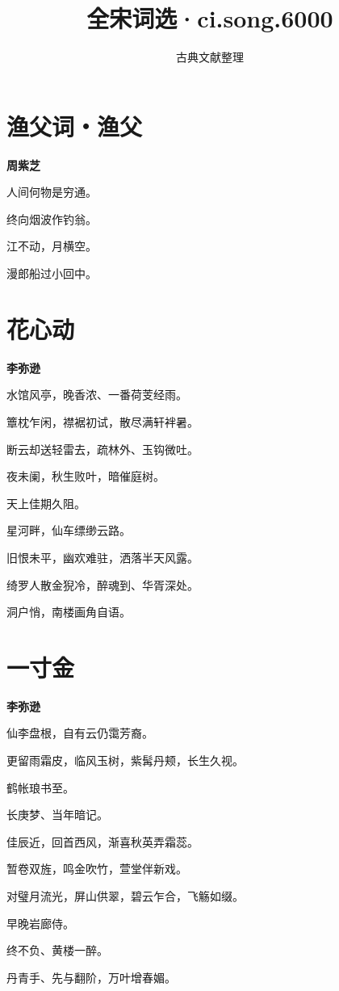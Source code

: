 \documentclass[12pt,a4paper]{ctexbook}
\title{全宋词选·ci.song.6000}
\author{古典文献整理}
\date{}
\begin{document}
\maketitle
\tableofcontents
\newpage
\section{渔父词・渔父}
\textbf{周紫芝}\par\vspace{0.5em}
人间何物是穷通。\par
终向烟波作钓翁。\par
江不动，月横空。\par
漫郎船过小回中。\par

\section{花心动}
\textbf{李弥逊}\par\vspace{0.5em}
水馆风亭，晚香浓、一番荷芰经雨。\par
簟枕乍闲，襟裾初试，散尽满轩袢暑。\par
断云却送轻雷去，疏林外、玉钩微吐。\par
夜未阑，秋生败叶，暗催庭树。\par
天上佳期久阻。\par
星河畔，仙车缥缈云路。\par
旧恨未平，幽欢难驻，洒落半天风露。\par
绮罗人散金猊冷，醉魂到、华胥深处。\par
洞户悄，南楼画角自语。\par

\section{一寸金}
\textbf{李弥逊}\par\vspace{0.5em}
仙李盘根，自有云仍霭芳裔。\par
更留雨霜皮，临风玉树，紫髯丹颊，长生久视。\par
鹤帐琅书至。\par
长庚梦、当年暗记。\par
佳辰近，回首西风，渐喜秋英弄霜蕊。\par
暂卷双旌，鸣金吹竹，萱堂伴新戏。\par
对璧月流光，屏山供翠，碧云乍合，飞觞如缀。\par
早晚岩廊侍。\par
终不负、黄楼一醉。\par
丹青手、先与翻阶，万叶增春媚。\par
\end{document}
